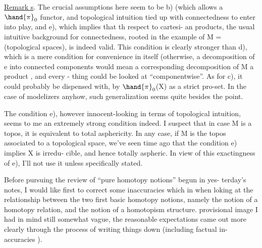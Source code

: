 
\uline{Remark s}. The crucial assumptions here seem to be b) (which allows 
 a $\hand{\pi}_0$ functor, and topological intuition tied up with connectedness
to enter into play\hand{)}, and e), which implies that th respect to cartesi-%
an products, the usual intuitive background for connectedness, rooted in
the example of M = (topological spaces), is indeed valid. This condition
is clearly stronger than d), which is a mere condition for convenience
in itself (otherwise, a decomposition of e into connected components
would mean a corresponding decomposition of M  a product , and every -%
thing could be looked at ``componentwise''\hand{)}. As for c), it could probably
be dispensed with, by  $\hand{\pi}_0$(X) as a strict pro-set. In the
case of modelizers anyhow, such generalization seems quite besides the
point.

The condition e), however innocent-looking in terms of topological
intuition, seems to me an extremely strong condition indeed. I suspect
that in case M is a topos, it is equivalent to total asphericity. In any
case, if M is the topos associated to a  topological space, we've seen
time ago  that  the condition  e) implies X is irredu-%
cible, and hence totally aspheric. In view of this exactingness of e),
I'll not use it unless specifically stated.


 Before pursuing the review of ``pure homotopy notions'' begun in yes-%
terday's notes, I would like first to correct some inaccuracies which
 in when loking at the relationship between the two first basic
homotopy notions, namely the notion of a homotopy relation, and the 
notion of a homotopism structure.  
  provisional image I had in mind
 still somewhat vague,  the reasonable expectations came out more
clearly through the process of writing things down (including factual in-%
accuracies \hand{!}).

